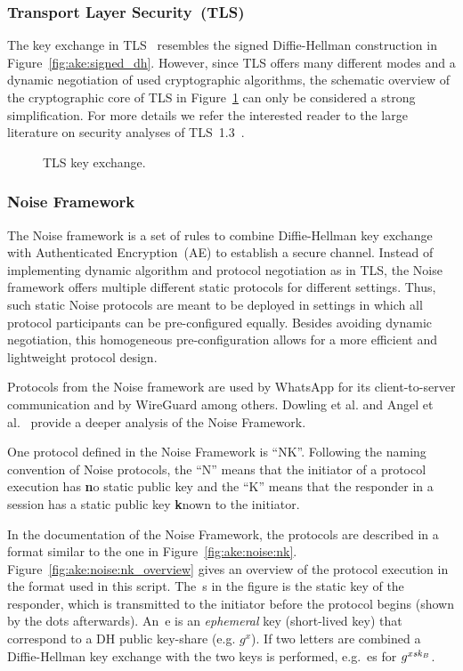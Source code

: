 \subsubsection{Transport Layer Security~(TLS)}
The key exchange in TLS~\cite{rfc8446} resembles the signed Diffie-Hellman construction in Figure~\ref{fig:ake:signed_dh}.
However, since TLS offers many different modes and a dynamic negotiation of used cryptographic algorithms, the schematic overview of the cryptographic core of TLS in Figure~\ref{fig:ake:tls} can only be considered a strong simplification.
For more details we refer the interested reader to the large literature on security analyses of TLS~1.3~\cite{JC:DFGS21,JC:DieJag21,EC:DDGJ22,AC:BDEFKK22}.

\begin{figure}[!ht]
    \centering
    
    \caption{TLS key exchange.}
    \label{fig:ake:tls}
\end{figure}



\subsubsection{Noise Framework}\label{sec:NoiseFramework}
The Noise framework \cite{NoiseFramework} is a set of rules to combine Diffie-Hellman key exchange with Authenticated Encryption~(AE) to establish a secure channel.
Instead of implementing dynamic algorithm and protocol negotiation as in TLS, the Noise framework offers multiple different static protocols for different settings.
Thus, such static Noise protocols are meant to be deployed in settings in which all protocol participants can be pre-configured equally.
Besides avoiding dynamic negotiation, this homogeneous pre-configuration allows for a more efficient and lightweight protocol design.

Protocols from the Noise framework are used by WhatsApp for its client-to-server communication and by WireGuard among others.
Dowling et al. \cite{PKC:DowRosSch20} and Angel et al.~\cite{CCS:ADHSW22} provide a deeper analysis of the Noise Framework.

One protocol defined in the Noise Framework is ``NK''. 
Following the naming convention of Noise protocols, the ``N'' means that the initiator of a protocol execution has \textbf{n}o static public key and the ``K'' means that the responder in a session has a static public key \textbf{k}nown to the initiator.

In the documentation of the Noise Framework, the protocols are described in a format similar to the one in Figure~\ref{fig:ake:noise:nk}.
Figure~\ref{fig:ake:noise:nk_overview} gives an overview of the protocol execution in the format used in this script.
The~s in the figure is the static key of the responder, which is transmitted to the initiator before the protocol begins (shown by the dots afterwards).
An~e is an \emph{ephemeral} key (short-lived key) that correspond to a DH public key-share (e.g. $g^x$).
If two letters are combined a Diffie-Hellman key exchange with the two keys is performed, e.g.~es for $g^{x\mathit{sk}_B}$.

